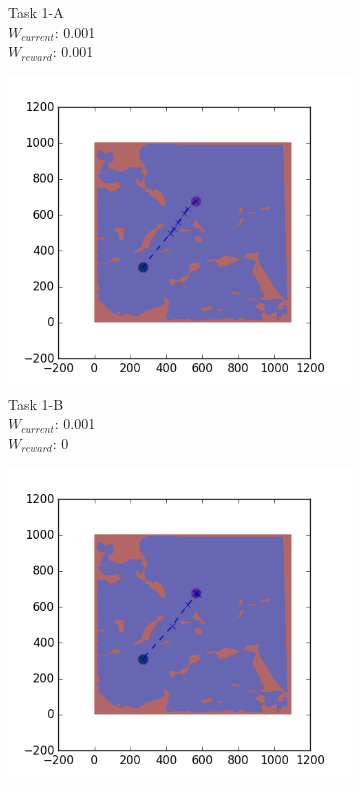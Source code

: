 \documentclass{tamuccthesis}
\begin{document}
\begin{figure}
\begin{subfigure}[b]{0.24\textwidth}
        \caption{{\small Task 1-A \\ $W_{current}$: 0.001 \\ $W_{reward}$: 0.001}}
        \label{fig:Path_1-A_upCurrent_Reward}
    \end{subfigure}
    \begin{subfigure}[b]{0.24\textwidth}
        \centering
        \includegraphics[width=\textwidth,trim={4cm 3cm 2cm 3cm},clip]{EXP3RG_PathAb_-1_-1_0d001_0.png}
        \caption{{\small Task 1-B \\ $W_{current}$: 0.001 \\ $W_{reward}$: 0}}
        \label{fig:Path_1-B_upCurrent_noReward}
    \end{subfigure}
    \begin{subfigure}[b]{0.24\textwidth}  
        \centering 
        \includegraphics[width=\textwidth,trim={4cm 3cm 2cm 3cm},clip]{EXP3RG_PathAb_-1_-1_0d001_-1.png}

\end{subfigure}
\end{figure}
\end{document}
